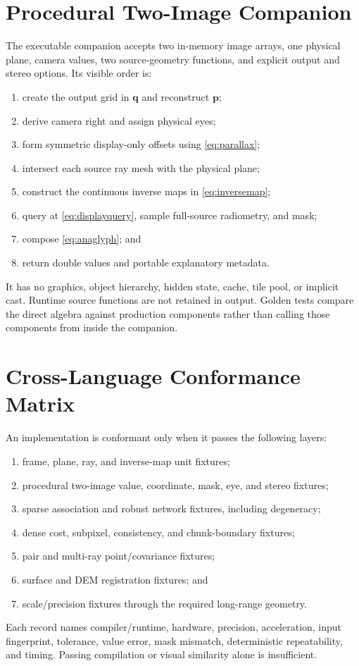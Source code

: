 \documentclass[journal]{IEEEtran}
\begin{document}
\section{Procedural Two-Image Companion}

The executable companion accepts two in-memory image arrays, one physical
plane, camera values, two source-geometry functions, and explicit output and
stereo options. Its visible order is:
\begin{enumerate}
\item create the output grid in $\bm q$ and reconstruct $\bm p$;
\item derive camera right and assign physical eyes;
\item form symmetric display-only offsets using \eqref{eq:parallax};
\item intersect each source ray mesh with the physical plane;
\item construct the continuous inverse maps in \eqref{eq:inversemap};
\item query at \eqref{eq:displayquery}, sample full-source radiometry, and mask;
\item compose \eqref{eq:anaglyph}; and
\item return double values and portable explanatory metadata.
\end{enumerate}
It has no graphics, object hierarchy, hidden state, cache, tile pool, or implicit
cast. Runtime source functions are not retained in output. Golden tests compare
the direct algebra against production components rather than calling those
components from inside the companion.

\section{Cross-Language Conformance Matrix}

An implementation is conformant only when it passes the following layers:
\begin{enumerate}
\item frame, plane, ray, and inverse-map unit fixtures;
\item procedural two-image value, coordinate, mask, eye, and stereo fixtures;
\item sparse association and robust network fixtures, including degeneracy;
\item dense cost, subpixel, consistency, and chunk-boundary fixtures;
\item pair and multi-ray point/covariance fixtures;
\item surface and DEM registration fixtures; and
\item scale/precision fixtures through the required long-range geometry.
\end{enumerate}
Each record names compiler/runtime, hardware, precision, acceleration, input
fingerprint, tolerance, value error, mask mismatch, deterministic repeatability,
and timing. Passing compilation or visual similarity alone is insufficient.



\end{document}
